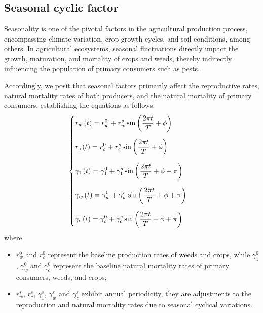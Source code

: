 \documentclass{mcmthesis}
\begin{document}
\subsection{Seasonal cyclic factor}
Seasonality is one of the pivotal factors in the agricultural production process, encompassing climate variation, crop growth cycles, and soil conditions, among others. In agricultural ecosystems, seasonal fluctuations directly impact the growth, maturation, and mortality of crops and weeds, thereby indirectly influencing the population of primary consumers such as pests.

Accordingly, we posit that seasonal factors primarily affect the reproductive rates, natural mortality rates of both producers, and the natural mortality of primary consumers, establishing the equations as follows:
\begin{align}
\label{eq:model2_season}
\begin{cases}
\displaystyle \vspace{10pt}
r_w\left( t \right) =r_{w}^{0}+r_{w}^{s}\sin \left( \frac{2\pi t}{T}+\phi \right) 
\\
\displaystyle \vspace{10pt}
r_c\left( t \right) =r_{c}^{0}+r_{c}^{s}\sin \left( \frac{2\pi t}{T}+\phi \right) 
\\
\displaystyle \vspace{10pt}
\gamma _{1}\left( t \right) =\gamma _1^{0} +\gamma _{1}^{s}\sin \left( \frac{2\pi t}{T}+\phi + \pi \right)
\\
\displaystyle \vspace{10pt}
\gamma _{w}\left( t \right) =\gamma _w^{0} +\gamma _{w}^{s}\sin \left( \frac{2\pi t}{T}+\phi + \pi \right)
\\
\displaystyle
\gamma _{c}\left( t \right) =\gamma _c^{0} +\gamma _{c}^{s}\sin \left( \frac{2\pi t}{T}+\phi + \pi \right)
\end{cases}
\end{align}
where
\begin{itemize}
    \item $r_{w}^{0}$ and $r_{c}^{0}$ represent the baseline production rates of weeds and crops, while $\gamma_1^{0}$,  $\gamma_w^{0}$ and $\gamma_c^{0}$ represent the baseline natural mortality rates of primary consumers, weeds, and crops;
    \item $r_{w}^{s}$, $r_{c}^{s}$, $\gamma_{1}^{s}$, $\gamma_{w}^{s}$ and $\gamma_{c}^{s}$ exhibit annual periodicity, they are adjustments to the reproduction and natural mortality rates due to seasonal cyclical variations.
\end{itemize}
\end{document}

